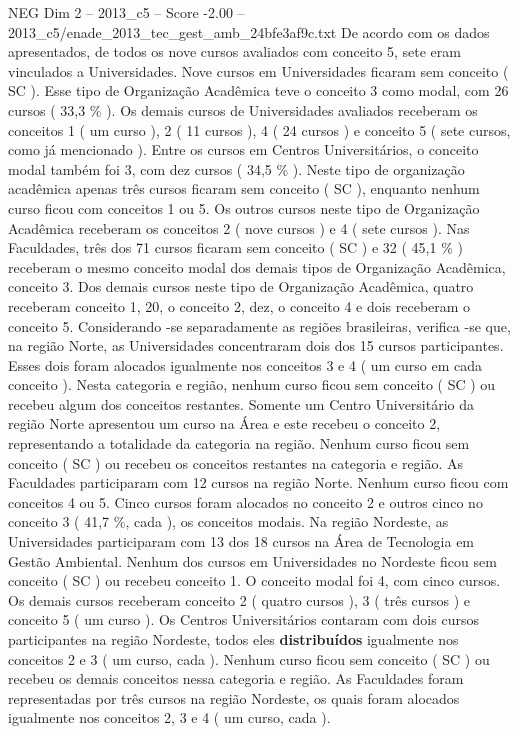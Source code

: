 \begin{textsample}{NEG Dim 2 – 2013\_c5 – Score -2.00 – 2013\_c5/enade\_2013\_tec\_gest\_amb\_24bfe3af9c.txt}
De acordo com os dados apresentados, de todos os nove cursos avaliados com conceito 5, sete eram vinculados a Universidades.
Nove cursos em Universidades ficaram sem conceito ( SC ).
Esse tipo de Organização Acadêmica teve o conceito 3 como modal, com 26 cursos ( 33,3 \% ).
Os demais cursos de Universidades avaliados receberam os conceitos 1 ( um curso ), 2 ( 11 cursos ), 4 ( 24 cursos ) e conceito 5 ( sete cursos, como já mencionado ).
Entre os cursos em Centros Universitários, o conceito modal também foi 3, com dez cursos ( 34,5 \% ).
Neste tipo de organização acadêmica apenas três cursos ficaram sem conceito ( SC ), enquanto nenhum curso ficou com conceitos 1 ou 5.
Os outros cursos neste tipo de Organização Acadêmica receberam os conceitos 2 ( nove cursos ) e 4 ( sete cursos ).
Nas Faculdades, três dos 71 cursos ficaram sem conceito ( SC ) e 32 ( 45,1 \% ) receberam o mesmo conceito modal dos demais tipos de Organização Acadêmica, conceito 3.
Dos demais cursos neste tipo de Organização Acadêmica, quatro receberam conceito 1, 20, o conceito 2, dez, o conceito 4 e dois receberam o conceito 5.
Considerando -se separadamente as regiões brasileiras, verifica -se que, na região Norte, as Universidades concentraram dois dos 15 cursos participantes.
Esses dois foram alocados igualmente nos conceitos 3 e 4 ( um curso em cada conceito ).
Nesta categoria e região, nenhum curso ficou sem conceito ( SC ) ou recebeu algum dos conceitos restantes.
Somente um Centro Universitário da região Norte apresentou um curso na Área e este recebeu o conceito 2, representando a totalidade da categoria na região.
Nenhum curso ficou sem conceito ( SC ) ou recebeu os conceitos restantes na categoria e região.
As Faculdades participaram com 12 cursos na região Norte.
Nenhum curso ficou com conceitos 4 ou 5.
Cinco cursos foram alocados no conceito 2 e outros cinco no conceito 3 ( 41,7 \%, cada ), os conceitos modais.
Na região Nordeste, as Universidades participaram com 13 dos 18 cursos na Área de Tecnologia em Gestão Ambiental.
Nenhum dos cursos em Universidades no Nordeste ficou sem conceito ( SC ) ou recebeu conceito 1.
O conceito modal foi 4, com cinco cursos.
Os demais cursos receberam conceito 2 ( quatro cursos ), 3 ( três cursos ) e conceito 5 ( um curso ).
Os Centros Universitários contaram com dois cursos participantes na região Nordeste, todos eles \textbf{distribuídos} igualmente nos conceitos 2 e 3 ( um curso, cada ).
Nenhum curso ficou sem conceito ( SC ) ou recebeu os demais conceitos nessa categoria e região.
As Faculdades foram representadas por três cursos na região Nordeste, os quais foram alocados igualmente nos conceitos 2, 3 e 4 ( um curso, cada ).

\end{textsample}
